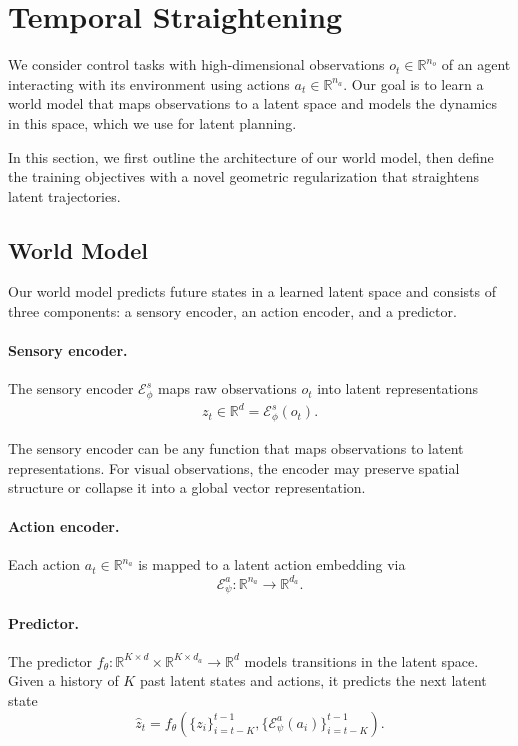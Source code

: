 \section{Temporal Straightening}
We consider control tasks with high-dimensional observations $o_t \in \mathbb{R}^{n_o}$ of an agent interacting with its environment using actions $a_t \in \mathbb{R}^{n_a}$. Our goal is to learn a world model that maps observations to a latent space and models the dynamics in this space, which we use for latent planning. 

In this section, we first outline the architecture of our world model, then define the training objectives with a novel geometric regularization that straightens latent trajectories. 

\subsection{World Model}
Our world model predicts future states in a learned latent space and consists of three components: a sensory encoder, an action encoder, and a predictor. 

\paragraph{Sensory encoder.}
The sensory encoder $\mathcal{E}^s_\phi$ maps raw observations $o_t$ into latent representations
\begin{align}
z_t \in \mathbb{R}^{d} = \mathcal{E}^s_\phi(o_t).
\end{align}

The sensory encoder can be any function that maps observations to latent representations. For visual observations, the encoder may preserve spatial structure or collapse it into a global vector representation.

\paragraph{Action encoder.}
Each action $a_t \in \mathbb{R}^{n_a}$ is mapped to a latent action embedding via 
\[
\mathcal{E}^a_\psi: \mathbb{R}^{n_a} \to \mathbb{R}^{d_a}.
\]


\paragraph{Predictor.}
The predictor \mbox{$f_\theta: \mathbb{R}^{K \times d} \times \mathbb{R}^{K \times d_a} \to \mathbb{R}^{d}$} models transitions in the latent space. Given a history of $K$ past latent states and actions, it predicts the next latent state
\begin{equation}
\hat{z}_{t} = f_\theta \left( \{z_i\}_{i=t-K}^{t-1}, \{\mathcal{E}^a_\psi(a_i)\}_{i=t-K}^{t-1} \right). \end{equation}


